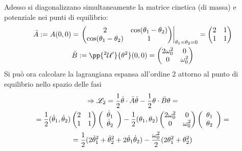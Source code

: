 \documentclass[Main.tex]{subfiles}
\begin{document}
\begin{tema}
Adesso si diagonalizzano simultaneamente la matrice cinetica (di massa) e potenziale nei punti di equilibrio:
\begin{gather}
	\bar A := A(0,0) = \left.\left( \begin{matrix}
		2 & \cos (\theta_1- \theta_2) \\
		\cos (\theta_1- \theta_2) & 1 
	\end{matrix} \right) \right|_{\theta_1=\theta_2=0} = \left( \begin{matrix} 2 & 1 \\ 1 & 1 \end{matrix} \right)\\
	\bar B:= \pp{^2 \U'}{\theta^2} (0,0) = \left( \begin{matrix} 2 \omega_0^2 & 0 \\ 0 & \omega_0^2 \end{matrix} \right)
\end{gather}
Si può ora calcolare la lagrangiana espansa all'ordine 2 attorno al punto di equilibrio nello spazio delle fasi
\begin{gather}
	\Rightarrow \mathscr{L} _2= \frac{1}{2} \dot \theta \cdot \bar A \dot \theta - \frac{1}{2} \theta \cdot \bar B \theta=\\ = \frac{1}{2} ( \dot \theta_1, \dot \theta_2) \left( \begin{matrix}
		2 & 1 \\ 1 & 1
	\end{matrix} \right) \left( \begin{array}{c} \dot \theta_1 \\ \dot \theta_2 \end{array} \right) - \frac{1}{2} ( \theta_1, \theta_2) \left( \begin{matrix}
		2 \omega_0^2 & 0 \\ 0 & \omega_0^2 
	\end{matrix}\right)  \left( \begin{array}{c}  \theta_1 \\ \theta_2 \end{array} \right) = \\
	= \frac{1}{2} (2 \dot \theta_1^2 + \dot \theta^2_2 + 2 \dot \theta_1 \dot \theta_2 ) - \frac{\omega_0^2}{2} ( 2 \theta_1^2 + \theta_2^2)
\end{gather}


\end{tema}
\end{document}
